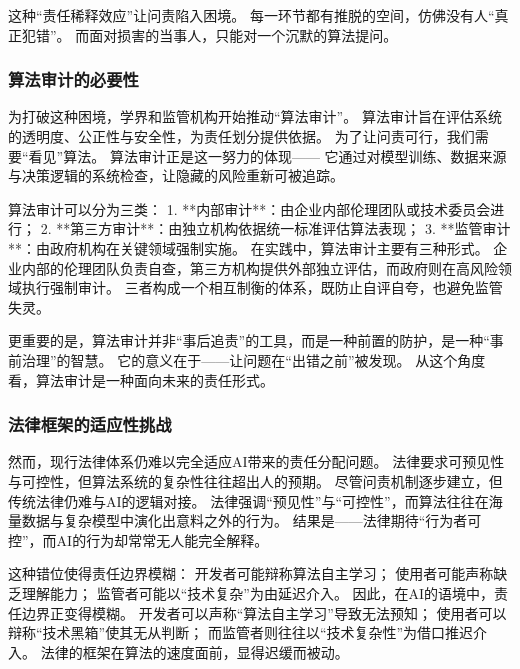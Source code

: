 这种“责任稀释效应”让问责陷入困境。  
每一环节都有推脱的空间，仿佛没有人“真正犯错”。  
而面对损害的当事人，只能对一个沉默的算法提问。

\subsubsection{算法审计的必要性}

为打破这种困境，学界和监管机构开始推动“算法审计”。  
算法审计旨在评估系统的透明度、公正性与安全性，为责任划分提供依据。  
为了让问责可行，我们需要“看见”算法。  
算法审计正是这一努力的体现——  
它通过对模型训练、数据来源与决策逻辑的系统检查，让隐藏的风险重新可被追踪。

算法审计可以分为三类：  
1. **内部审计**：由企业内部伦理团队或技术委员会进行；  
2. **第三方审计**：由独立机构依据统一标准评估算法表现；  
3. **监管审计**：由政府机构在关键领域强制实施。  
在实践中，算法审计主要有三种形式。  
企业内部的伦理团队负责自查，第三方机构提供外部独立评估，而政府则在高风险领域执行强制审计。  
三者构成一个相互制衡的体系，既防止自评自夸，也避免监管失灵。

更重要的是，算法审计并非“事后追责”的工具，而是一种前置的防护，是一种“事前治理”的智慧。  
它的意义在于——让问题在“出错之前”被发现。  
从这个角度看，算法审计是一种面向未来的责任形式。

\subsubsection{法律框架的适应性挑战}

然而，现行法律体系仍难以完全适应AI带来的责任分配问题。  
法律要求可预见性与可控性，但算法系统的复杂性往往超出人的预期。  
尽管问责机制逐步建立，但传统法律仍难与AI的逻辑对接。  
法律强调“预见性”与“可控性”，而算法往往在海量数据与复杂模型中演化出意料之外的行为。  
结果是——法律期待“行为者可控”，而AI的行为却常常无人能完全解释。

这种错位使得责任边界模糊：  
开发者可能辩称算法自主学习；  
使用者可能声称缺乏理解能力；  
监管者可能以“技术复杂”为由延迟介入。  
因此，在AI的语境中，责任边界正变得模糊。  
开发者可以声称“算法自主学习”导致无法预知；  
使用者可以辩称“技术黑箱”使其无从判断；  
而监管者则往往以“技术复杂性”为借口推迟介入。  
法律的框架在算法的速度面前，显得迟缓而被动。


